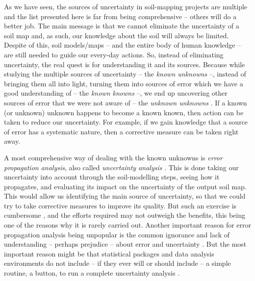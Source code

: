 As we have seen, the sources of uncertainty in soil-mapping projects are multiple and the list 
presented here is far from being comprehensive -- others will do a better job. The main message
is that we cannot eliminate the uncertainty of a soil map and, as such, our knowledge about the 
soil will always be limited. Despite of this, soil models/maps -- and the entire body of human 
knowledge -- are still needed to guide our every-day actions. So, instead of eliminating uncertainty, 
the real quest is for understanding it and its sources. Because while studying the multiple sources 
of uncertainty -- the \textit{known unknowns} --, instead of bringing them all into light, turning 
them into sources of error which we have a good understanding of -- the \textit{known knowns} --, 
we end up uncovering other sources of error that we were not aware of -- the \textit{unknown 
unknowns} \citep{Wikipedia2015}. If a known (or unknown) unknown happens to become a known known, 
then action can be taken to reduce our uncertainty. For example, if we gain knowledge that a source 
of error has a systematic nature, then a corrective measure can be taken right away.

A most comprehensive way of dealing with the known unknowns is \textit{error propagation analysis}, 
also called \textit{uncertainty analysis} \citep{HeuvelinkEtAl1989, Taylor1997}. This is done taking
our uncertainty into account through the soil-modelling steps, seeing how it propagates, and 
evaluating its impact on the uncertainty of the output soil map. This would allow us identifying the
main source of uncertainty, so that we could try to take corrective measures to improve its quality.
But such an exercise is cumbersome \citep{NelsonEtAl2011}, and the efforts required may not
outweigh the benefits, this being one of the reasons why it is rarely carried out. Another important 
reason for error propagation analysis being unpopular is the common ignorance and lack of 
understanding -- perhaps prejudice -- about error and uncertainty \citep{Wechsler2003, Heuvelink2005}.
But the most important reason might be that statistical packages and data analysis environments do 
not include -- if they ever will or should include -- a simple routine, a button, to run a complete 
uncertainty analysis \citep{HeuvelinkEtAl2006b}.

